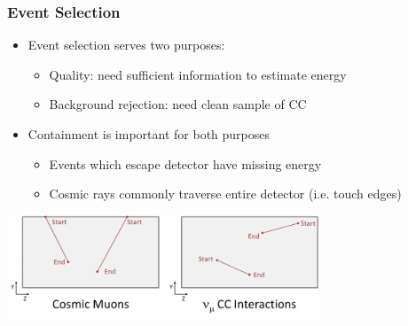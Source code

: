 \documentclass[10pt,professionalfonts,xcolor=table]{beamer}
\begin{document}
\begin{frame}
\frametitle{Event Selection}

\begin{itemize}
\item Event selection serves two purposes:
  \begin{itemize}
  \item Quality: need sufficient information to estimate energy
  \item Background rejection: need clean sample of \numu CC
  \end{itemize}
\item Containment is important for both purposes
  \begin{itemize}
  \item Events which escape detector have missing energy
  \item Cosmic rays commonly traverse entire detector (i.e. touch edges)
  \end{itemize}
\end{itemize}
\begin{center}
 \includegraphics[width=0.7\textwidth]{figures/selection/cosmicmuons.png}
\end{center}

\end{frame}
\end{document}

